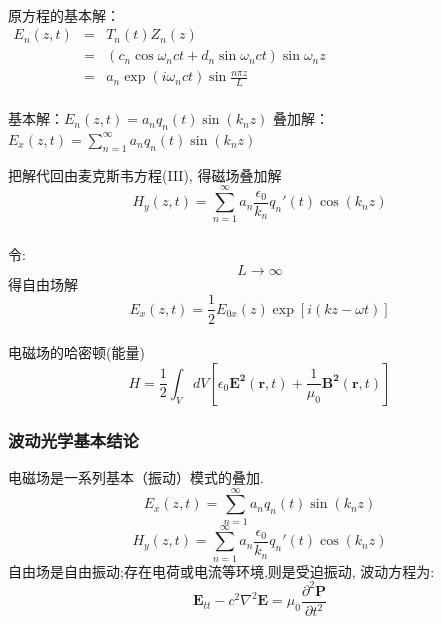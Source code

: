 \begin{frame}
    \frametitle{} 
    ~\\
    原方程的基本解：\\ {\vspace*{0.3em}}
	$\begin{array}{llll}
		E_n (z,t) &=& T_n(t)Z_n(z)\\
		&=& (c_n\cos \omega_nct+ d_n\sin \omega _nct ) \sin \omega_n z\\
        &=&a_n \exp(i \omega_n ct) \sin \frac{ n\pi z}{L} \\
	\end{array}$ \\  {\vspace*{0.6em}}    
    \begin{enumerate}
    \IItem 基本解：$\displaystyle E_{n}(z,t) = a_n q_n (t) \sin (k_n z) $
    \IItem 叠加解：$\displaystyle E_{x}(z,t) = \sum\limits_{n=1}^{\infty } a_n q_n (t) \sin (k_n z)$
    \end{enumerate}	
    把解代回由麦克斯韦方程(III), 得磁场叠加解 \\ 
    \[ H_{y}(z,t) = \sum\limits_{n=1}^{\infty } a_n \frac{\epsilon_0}{k_n}q_n ' (t) \cos (k_n z)\] 
\end{frame}

\begin{frame}
      \frametitle{}
    令: 
    \[  L \to \infty \]
    得自由场解 
    \[  E_{x}(z,t) = \frac{1}{2} E_{0x}(z) \exp [i(kz-\omega t)] \]
    ~~\\ 
    电磁场的哈密顿(能量)
    \[ H = \frac{1}{2} \int_V d V \left[ \epsilon_0 \mathbf{E^2}(\mathbf{r},t) + \frac{1}{\mu_0}\mathbf{B^2}(\mathbf{r},t)\right]\]

\end{frame}

\begin{frame} 
\frametitle{波动光学基本结论}
    电磁场是一系列基本（振动）模式的叠加.\\ 
    \[ E_{x}(z,t) = \sum\limits_{n=1}^{\infty } a_n q_n (t) \sin (k_n z)\]
    \[ H_{y}(z,t) = \sum\limits_{n=1}^{\infty } a_n \frac{\epsilon_0}{k_n}q_n ' (t) \cos (k_n z)\] 
    自由场是自由振动;存在电荷或电流等环境,则是受迫振动, 波动方程为:
    \[\mathbf{E}_{tt} -c^2\nabla^2 \mathbf{E} = \mu_0 \frac{\partial ^2 \mathbf{P}  }{\partial t^2}\]  
\end{frame}


